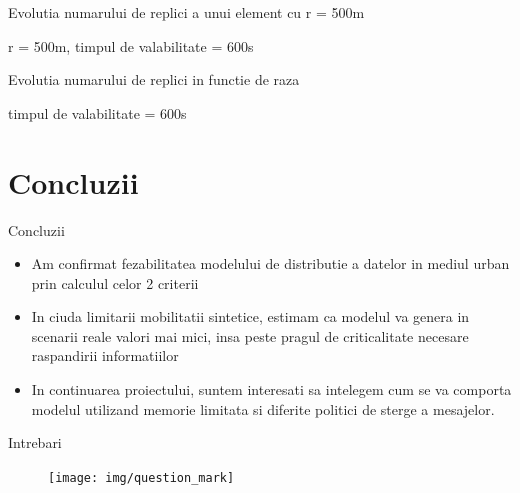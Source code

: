 \documentclass{beamer}
\begin{document}
\begin{frame}{Evolutia numarului de replici a unui element cu r = 500m}
	\begin{figure}[t]
		\centering
		\def\svgwidth{\columnwidth}
		
	\end{figure}
	
	\centerline{r = 500m, timpul de valabilitate = 600s}
\end{frame}
\begin{frame}{Evolutia numarului de replici in functie de raza}
	\begin{figure}[t]
		\centering
		\def\svgwidth{\columnwidth}
		
	\end{figure}
	
	\centerline{timpul de valabilitate = 600s}
\end{frame}

\section{Concluzii}
\begin{frame}{Concluzii}
	\begin{itemize}
	  \item Am confirmat fezabilitatea modelului de distributie a datelor in
	  mediul urban prin calculul celor 2 criterii
	  \item In ciuda limitarii mobilitatii sintetice, estimam ca modelul va
	  genera in scenarii reale valori mai mici, insa peste pragul de criticalitate
	  necesare raspandirii informatiilor
	  \item In continuarea proiectului, suntem interesati sa intelegem cum se va
	  comporta modelul utilizand memorie limitata si diferite politici de sterge a
	  mesajelor.
	\end{itemize}
\end{frame}
\begin{frame}{Intrebari}
	\begin{figure}
		\centering
		\texttt{[image: img/question\_mark]}
	\end{figure}
\end{frame}
\end{document}
